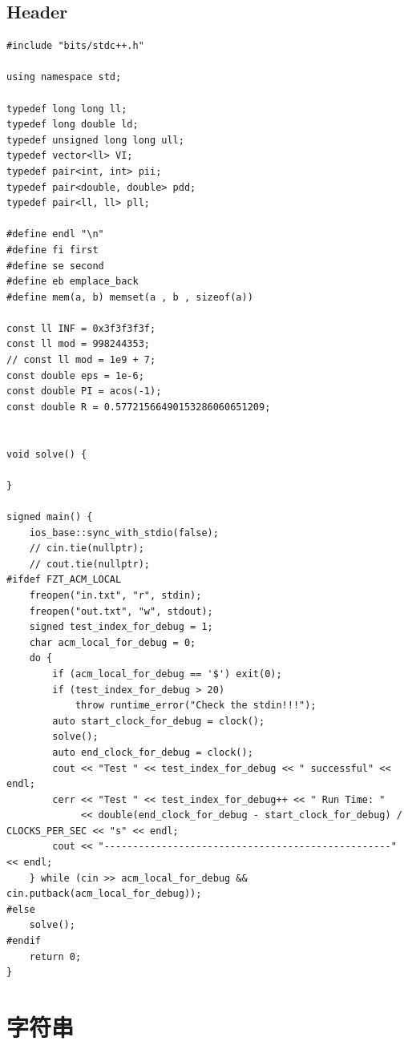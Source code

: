 \documentclass[twoside]{article}
\begin{document}
\subsection{Header}
\begin{lstlisting}
#include "bits/stdc++.h"

using namespace std;

typedef long long ll;
typedef long double ld;
typedef unsigned long long ull;
typedef vector<ll> VI;
typedef pair<int, int> pii;
typedef pair<double, double> pdd;
typedef pair<ll, ll> pll;

#define endl "\n"
#define fi first
#define se second
#define eb emplace_back
#define mem(a, b) memset(a , b , sizeof(a))

const ll INF = 0x3f3f3f3f;
const ll mod = 998244353;
// const ll mod = 1e9 + 7;
const double eps = 1e-6;
const double PI = acos(-1);
const double R = 0.57721566490153286060651209;


void solve() {

}

signed main() {
    ios_base::sync_with_stdio(false);
    // cin.tie(nullptr);
    // cout.tie(nullptr);
#ifdef FZT_ACM_LOCAL
    freopen("in.txt", "r", stdin);
    freopen("out.txt", "w", stdout);
    signed test_index_for_debug = 1;
    char acm_local_for_debug = 0;
    do {
        if (acm_local_for_debug == '$') exit(0);
        if (test_index_for_debug > 20)
            throw runtime_error("Check the stdin!!!");
        auto start_clock_for_debug = clock();
        solve();
        auto end_clock_for_debug = clock();
        cout << "Test " << test_index_for_debug << " successful" << endl;
        cerr << "Test " << test_index_for_debug++ << " Run Time: "
             << double(end_clock_for_debug - start_clock_for_debug) / CLOCKS_PER_SEC << "s" << endl;
        cout << "--------------------------------------------------" << endl;
    } while (cin >> acm_local_for_debug && cin.putback(acm_local_for_debug));
#else
    solve();
#endif
    return 0;
}
\end{lstlisting}
\clearpage\section{字符串}
\end{document}
